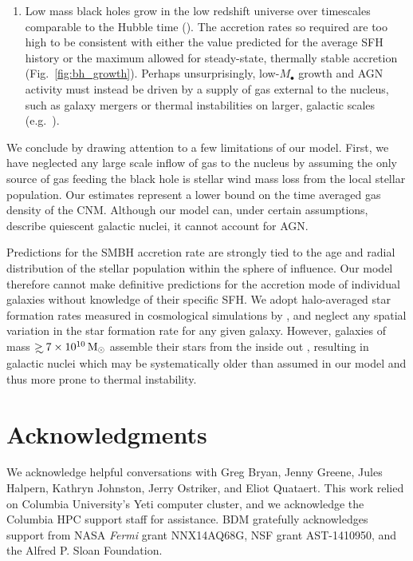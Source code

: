 \documentclass[usenatbib,fleqn]{mn2e}
\newcommand\gsim{\mathrel{\rlap{\lower4pt\hbox{\hskip1pt$\sim$}}
    \raise1pt\hbox{$>$}}}
\begin{document}
\begin{enumerate}
\item Low mass black holes grow in the low redshift universe over
  timescales comparable to the Hubble time (\citealt{Heckman+04}).  The
  accretion rates so required are too high to be consistent with either the
  value predicted for the average SFH history or the maximum allowed
  for steady-state, thermally stable accretion
  (Fig.~\ref{fig:bh_growth}).  Perhaps unsurprisingly, low-$M_{\bullet}$ growth and AGN
  activity must instead be driven by a supply of gas external to the
  nucleus, such as galaxy mergers or thermal instabilities on
  larger, galactic scales (e.g.~\citealt{Voit+15}).

    

\end{enumerate}
   

We conclude by drawing attention to a few limitations of our
model.  First, we have neglected any large scale inflow of gas to the
nucleus by assuming the only source of gas feeding the black hole is
stellar wind mass loss from the local stellar population.  Our
estimates represent a lower bound on the time averaged gas density of
the CNM.  Although our model can, under certain assumptions, describe quiescent galactic nuclei, it cannot account for AGN.

Predictions for the SMBH accretion rate are strongly tied to the age
and radial distribution of the stellar population within the sphere of
influence.  Our model therefore cannot make definitive predictions for
the accretion mode of individual galaxies without knowledge of their
specific SFH.  We adopt halo-averaged star formation rates measured in
cosmological simulations by \citet{MosterNaab+:2013a}, and neglect any
spatial variation in the star formation rate for any given
galaxy. However, galaxies of mass $\gsim 7\times 10^{10} \Msun$
assemble their stars from the inside out
\citep{PerezCidFernandes+:2013a}, resulting in galactic nuclei which
may be systematically older than assumed in our model and thus more
prone to thermal instability.  


\section*{Acknowledgments}

We acknowledge helpful conversations with Greg Bryan, Jenny Greene,
Jules Halpern, Kathryn Johnston, Jerry Ostriker, and Eliot Quataert.
This work relied on Columbia University's Yeti computer cluster, and
we acknowledge the Columbia HPC support staff for assistance.  BDM
gratefully acknowledges support from NASA {\it Fermi} grant
NNX14AQ68G, NSF grant AST-1410950, and the Alfred P. Sloan Foundation.
\end{document}
